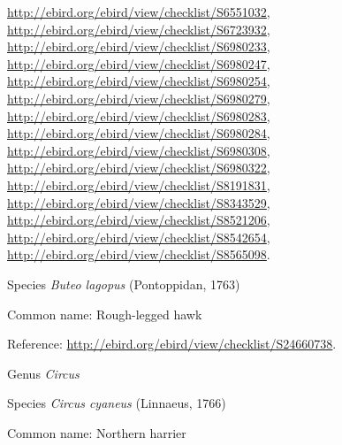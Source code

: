 \documentclass[9pt, article]{memoir}
\begin{document}
\begin{multicols}{2}
\url{http://ebird.org/ebird/view/checklist/S6551032}, 
\url{http://ebird.org/ebird/view/checklist/S6723932}, 
\url{http://ebird.org/ebird/view/checklist/S6980233}, 
\url{http://ebird.org/ebird/view/checklist/S6980247}, 
\url{http://ebird.org/ebird/view/checklist/S6980254}, 
\url{http://ebird.org/ebird/view/checklist/S6980279}, 
\url{http://ebird.org/ebird/view/checklist/S6980283}, 
\url{http://ebird.org/ebird/view/checklist/S6980284}, 
\url{http://ebird.org/ebird/view/checklist/S6980308}, 
\url{http://ebird.org/ebird/view/checklist/S6980322}, 
\url{http://ebird.org/ebird/view/checklist/S8191831}, 
\url{http://ebird.org/ebird/view/checklist/S8343529}, 
\url{http://ebird.org/ebird/view/checklist/S8521206}, 
\url{http://ebird.org/ebird/view/checklist/S8542654}, 
\url{http://ebird.org/ebird/view/checklist/S8565098}.

\vspace{6pt}\noindent\hspace{36pt}Species \textit{Buteo lagopus} (Pontoppidan, 1763)


Common name: Rough-legged hawk

Reference: 
\url{http://ebird.org/ebird/view/checklist/S24660738}.

\vspace{6pt}\noindent\hspace{30pt}Genus \textit{Circus}


\vspace{6pt}\noindent\hspace{36pt}Species \textit{Circus cyaneus} (Linnaeus, 1766)


Common name: Northern harrier


\end{multicols}
\end{document}
